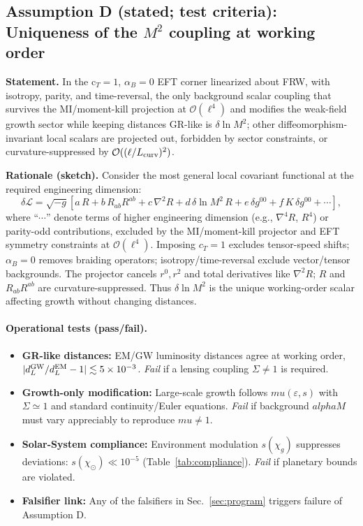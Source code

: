\documentclass[aps,prd,onecolumn,superscriptaddress,nofootinbib]{revtex4-2}
\def\mu{mu}%
\def\alpha{alpha}%
\def\alpha_M{alphaM}%
\providecommand{\be}{\begin{equation}}
\providecommand{\ee}{\end{equation}}
\begin{document}
\subsection{Assumption D (stated; test criteria): Uniqueness of the \texorpdfstring{$M^2$}{M^2} coupling at working order}
\label{sec:lemmaD}

\noindent\textbf{Statement.} In the c\(_T\!=\!1\), \(\alpha_B\!=\!0\) EFT corner linearized about FRW, with isotropy, parity, and time-reversal, the only background scalar coupling that survives the MI/moment-kill projection at \(\mathcal O(\ell^4)\) and modifies the weak-field growth sector while keeping distances GR-like is \(\delta\ln M^2\); other diffeomorphism-invariant local scalars are projected out, forbidden by sector constraints, or curvature-suppressed by \(\mathcal O((\ell/L_{\rm curv})^2)\).

\smallskip
\noindent\textbf{Rationale (sketch).} Consider the most general local covariant functional at the required engineering dimension:
\be
\delta\mathcal L=\sqrt{-g}\left[a\,R+b\,R_{ab}R^{ab}+c\,\nabla^2 R+d\,\delta\ln M^2\,R
+ e\,\delta g^{00}+ f\,K\,\delta g^{00}+ \cdots\right],
\ee
\noindent where ``\(\cdots\)'' denote terms of higher engineering dimension (e.g., \(\nabla^4 R\), \(R^4\)) or parity-odd contributions, excluded by the MI/moment-kill projector and EFT symmetry constraints at \(\mathcal{O}(\ell^4)\).
Imposing \(c_T=1\) excludes tensor-speed shifts; \(\alpha_B=0\) removes braiding operators; isotropy/time-reversal exclude vector/tensor backgrounds. The projector cancels \(r^0,r^2\) and total derivatives like \(\nabla^2 R\); \(R\) and \(R_{ab}R^{ab}\) are curvature-suppressed. Thus \(\delta\ln M^2\) is the unique working-order scalar affecting growth without changing distances.

\paragraph{Operational tests (pass/fail).}
\begin{itemize}[leftmargin=*,noitemsep,topsep=0pt]
\item \textbf{GR-like distances:} EM/GW luminosity distances agree at working order, $|d_L^{\rm GW}/d_L^{\rm EM}-1|\lesssim5\times10^{-3}$. \emph{Fail} if a lensing coupling $\Sigma\neq1$ is required.
\item \textbf{Growth-only modification:} Large-scale growth follows $\mu(\varepsilon,s)$ with $\Sigma\simeq1$ and standard continuity/Euler equations. \emph{Fail} if background $\alpha_M$ must vary appreciably to reproduce $\mu\neq1$.
\item \textbf{Solar-System compliance:} Environment modulation $s(\chi_g)$ suppresses deviations: $s(\chi_\odot)\ll10^{-5}$ (Table~\ref{tab:compliance}). \emph{Fail} if planetary bounds are violated.
\item \textbf{Falsifier link:} Any of the falsifiers in Sec.~\ref{sec:program} triggers failure of Assumption D.
\end{itemize}
\end{document}
